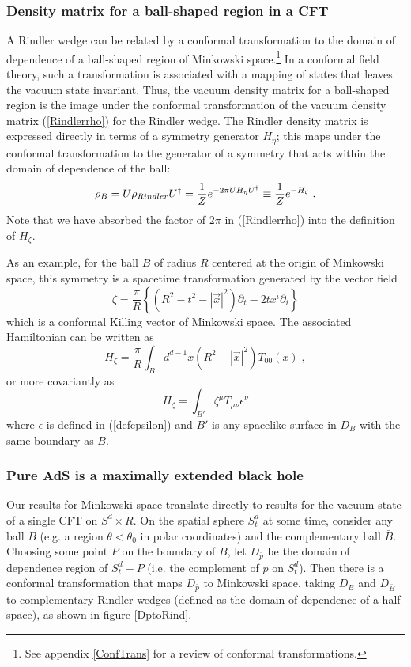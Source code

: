 \documentclass[12pt,epsf]{article}
\newcommand{\be}{\begin{equation}}
\newcommand{\ee}{\end{equation}}
\begin{document}
\subsubsection*{Density matrix for a ball-shaped region in a CFT}

A Rindler wedge can be related by a conformal transformation to the domain of dependence of a ball-shaped region of Minkowski space.\footnote{See appendix \ref{ConfTrans} for a review of conformal transformations.} In a conformal field theory, such a transformation is associated with a mapping of states that leaves the vacuum state invariant. Thus, the vacuum density matrix for a ball-shaped region is the image under the conformal transformation of the vacuum density matrix (\ref{Rindlerrho}) for the Rindler wedge. The Rindler density matrix is expressed directly in terms of a symmetry generator $H_\eta$; this maps under the conformal transformation to the generator of a symmetry that acts within the domain of dependence of the ball:
\be
\label{DMball}
\rho_B = U \rho_{Rindler} U^\dagger = {1 \over Z} e^{- 2 \pi U H_\eta U^\dagger} \equiv {1 \over Z} e^{- H_\zeta} \; .
\ee
Note that we have absorbed the factor of $2 \pi$ in (\ref{Rindlerrho}) into the definition of $H_\zeta$.

As an example, for the ball $B$ of radius $R$ centered at the origin of Minkowski space, this symmetry is a spacetime transformation generated by the vector field
\be\label{defzeta}
\zeta = \frac{\pi}{R} \left\{ (R^2 - t^2 - |\vec{x}|^2) \partial_t - 2 t x^i \partial_i \right\}
\ee
which is a conformal Killing vector of Minkowski space. The associated Hamiltonian can be written as \cite{casini2011towards}
\be
\label{modHball}
H_\zeta = \frac{\pi}{R} \int_B d^{d-1} x (R^2 - |\vec{x}|^2) T_{00}(x) \; ,
\ee
or more covariantly as
\be
H_\zeta = \int_{B'} \zeta^\mu T_{\mu \nu} \epsilon^\nu
\ee
where $\epsilon$ is defined in (\ref{defepsilon}) and $B'$ is any spacelike surface in $D_B$ with the same boundary as $B$.

\subsubsection*{Pure AdS is a maximally extended black hole}

Our results for Minkowski space translate directly to results for the vacuum state of a single CFT on $S^d \times R$. On the spatial sphere $S^d_t$ at some time, consider any ball $B$ (e.g. a region $\theta < \theta_0$ in polar coordinates) and the complementary ball $\bar{B}$. Choosing some point $P$ on the boundary of $B$, let $D_{\bar{p}}$ be the domain of dependence region of $S^d_t - P$ (i.e. the complement of $p$ on $S^d_t$). Then there is a conformal transformation that maps $D_{\bar{p}}$ to Minkowski space, taking $D_B$ and $D_{\bar{B}}$ to complementary Rindler wedges (defined as the domain of dependence of a half space), as shown in figure \ref{DptoRind}.
\end{document}
